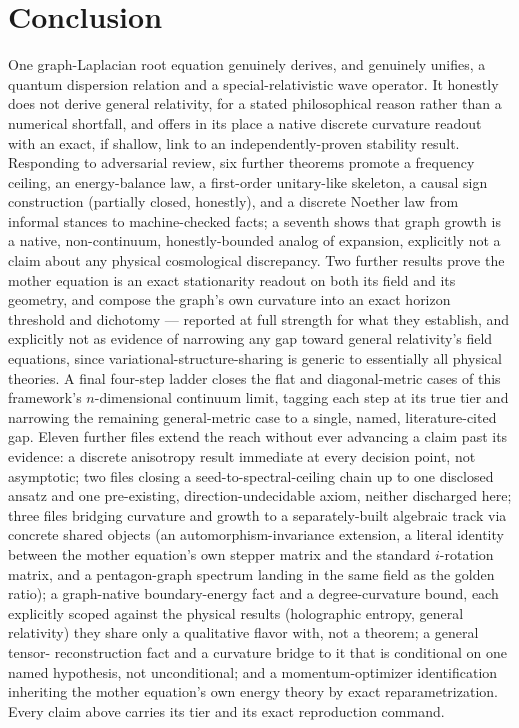 \documentclass[10pt,twocolumn]{article}
\begin{document}
\section{Conclusion}
One graph-Laplacian root equation genuinely derives, and genuinely unifies, a
quantum dispersion relation and a special-relativistic wave operator. It honestly
does not derive general relativity, for a stated philosophical reason rather than a
numerical shortfall, and offers in its place a native discrete curvature readout
with an exact, if shallow, link to an independently-proven stability result.
Responding to adversarial review, six further theorems promote a frequency ceiling,
an energy-balance law, a first-order unitary-like skeleton, a causal sign
construction (partially closed, honestly), and a discrete Noether law from informal
stances to machine-checked facts; a seventh shows that graph growth is a native,
non-continuum, honestly-bounded analog of expansion, explicitly not a claim about
any physical cosmological discrepancy. Two further results prove the mother
equation is an exact stationarity readout on both its field and its geometry, and
compose the graph's own curvature into an exact horizon threshold and dichotomy ---
reported at full strength for what they establish, and explicitly not as evidence
of narrowing any gap toward general relativity's field equations, since
variational-structure-sharing is generic to essentially all physical theories. A
final four-step ladder closes the flat and diagonal-metric cases of this
framework's $n$-dimensional continuum limit, tagging each step at its true tier and
narrowing the remaining general-metric case to a single, named, literature-cited
gap. Eleven further files extend the reach without ever advancing a claim past
its evidence: a discrete anisotropy result immediate at every decision point,
not asymptotic; two files closing a seed-to-spectral-ceiling chain up to one
disclosed ansatz and one pre-existing, direction-undecidable axiom, neither
discharged here; three files bridging curvature and growth to a
separately-built algebraic track via concrete shared objects (an
automorphism-invariance extension, a literal identity between the mother
equation's own stepper matrix and the standard $i$-rotation matrix, and a
pentagon-graph spectrum landing in the same field as the golden ratio); a
graph-native boundary-energy fact and a degree-curvature bound, each explicitly scoped
against the physical results (holographic entropy, general relativity) they
share only a qualitative flavor with, not a theorem; a general tensor-
reconstruction fact and a curvature bridge to it that is conditional on one
named hypothesis, not unconditional; and a momentum-optimizer identification
inheriting the mother equation's own energy theory by exact reparametrization.
Every claim above carries its tier and its exact reproduction command.
\end{document}
